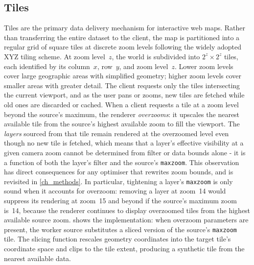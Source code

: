 \subsection{Tiles}\label{sec_tiles}

Tiles are the primary data delivery mechanism for interactive web maps.
Rather than transferring the entire dataset to the client, the map is partitioned into a regular grid of square tiles at discrete zoom levels following the widely adopted XYZ tiling scheme.
At zoom level~$z$, the world is subdivided into $2^z \times 2^z$ tiles, each identified by its column~$x$, row~$y$, and zoom level~$z$.
Lower zoom levels cover large geographic areas with simplified geometry; higher zoom levels cover smaller areas with greater detail.
The client requests only the tiles intersecting the current viewport, and as the user pans or zooms, new tiles are fetched while old ones are discarded or cached.
When a client requests a tile at a zoom level beyond the source's maximum, the renderer \emph{overzooms}: it upscales the nearest available tile from the source's highest available zoom to fill the viewport.
The \emph{layers} sourced from that tile remain rendered at the overzoomed level even though no new tile is fetched, which means that a layer's effective visibility at a given camera zoom cannot be determined from filter or data bounds alone - it is a function of both the layer's filter and the source's \texttt{maxzoom}.
This observation has direct consequences for any optimiser that rewrites zoom bounds, and is revisited in \cref{ch_methods}.
In particular, tightening a layer's \texttt{maxzoom} is only sound when it accounts for overzoom: removing a layer at zoom~14 would suppress its rendering at zoom~15 and beyond if the source's maximum zoom is~14, because the renderer continues to display overzoomed tiles from the highest available source zoom.
 shows the implementation: when overzoom parameters are present, the worker source substitutes a sliced version of the source's \texttt{maxzoom} tile.
The slicing function rescales geometry coordinates into the target tile's coordinate space and clips to the tile extent, producing a synthetic tile from the nearest available data.

